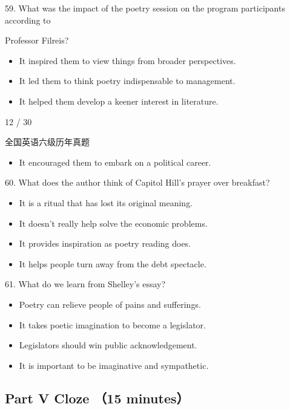 \documentclass[UTF8,11pt]{ctexart}
\begin{document}
59. What was the impact of the poetry session on the program participants according to


Professor Filreis?


\begin{itemize}[leftmargin=2em,itemsep=.2em,topsep=.4em]\item[A.] It inspired them to view things from broader perspectives.
\item[B.] It led them to think poetry indispensable to management.
\item[C.] It helped them develop a keener interest in literature.
\end{itemize}

12 / 30


全国英语六级历年真题


\begin{itemize}[leftmargin=2em,itemsep=.2em,topsep=.4em]\item[D.] It encouraged them to embark on a political career.
\end{itemize}

60. What does the author think of Capitol Hill's prayer over breakfast?


\begin{itemize}[leftmargin=2em,itemsep=.2em,topsep=.4em]\item[A.] It is a ritual that has lost its original meaning.
\item[B.] It doesn't really help solve the economic problems.
\item[C.] It provides inspiration as poetry reading does.
\item[D.] It helps people turn away from the debt spectacle.
\end{itemize}

61. What do we learn from Shelley's essay?


\begin{itemize}[leftmargin=2em,itemsep=.2em,topsep=.4em]\item[A.] Poetry can relieve people of pains and sufferings.
\item[B.] It takes poetic imagination to become a legislator.
\item[C.] Legislators should win public acknowledgement.
\item[D.] It is important to be imaginative and sympathetic.
\end{itemize}

\subsection*{\textbf{Part V} \textbf{Cloze} （\textbf{15 minutes}）}
\end{document}
